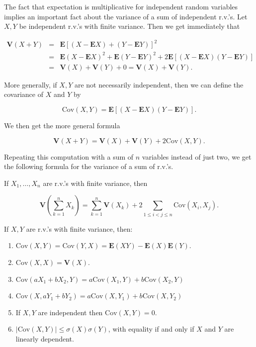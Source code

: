 \noindent The fact that expectation is multiplicative for
independent random variables implies an important fact
about the variance of a sum of independent r.v.'s. Let
$X,Y$ be independent r.v.'s with finite variance.
Then we get immediately that

\begin{eqnarray*}
\mathbf{V}(X+Y) &=& \mathbf{E}\left[(X-\mathbf{E} X)+(Y-\mathbf{E} Y)\right]^2 \\ &=&
\mathbf{E}(X-\mathbf{E} X)^2 + \mathbf{E}(Y-\mathbf{E} Y)^2 +2 \mathbf{E}\left[ (X-\mathbf{E} X)(Y-\mathbf{E} Y)\right] \\
&=& \mathbf{V}(X)+\mathbf{V}(Y) + 0 = \mathbf{V}(X)+\mathbf{V}(Y).
\end{eqnarray*}

\noindent More generally, if $X,Y$ are not necessarily
independent, then we can define the covariance of $X$
and $Y$ by

\[
\textrm{Cov}(X,Y) = \mathbf{E}\left[ (X-\mathbf{E} X)(Y-\mathbf{E} Y)\right].
\]

\noindent We then get the more general formula

\[
\mathbf{V}(X+Y) = \mathbf{V}(X) + \mathbf{V}(Y) + 2 \textrm{Cov}(X,Y).
\]

\noindent Repeating this computation with a sum of $n$
variables instead of just two, we get the following
formula for the variance of a sum of r.v.'s.

\begin{lem}
If $X_1,\ldots,X_n$ are r.v.'s with finite variance,
then

\[
\mathbf{V}\left(\sum_{k=1}^n X_k\right) = \sum_{k=1}^n \mathbf{V}(X_k) + 2 \sum_{1\le i<j\le n} \textrm{Cov}(X_i,X_j).
\]

\end{lem}

\begin{lem}
If $X,Y$ are r.v.'s with finite variance, then:

\begin{enumerate}[label=\arabic*.]
\item $\textrm{Cov}(X,Y)=\textrm{Cov}(Y,X) = \mathbf{E}(XY)
- \mathbf{E}(X) \mathbf{E}(Y)$.

\item $\textrm{Cov}(X,X) = \mathbf{V}(X)$.

\item $\textrm{Cov}(aX_1+bX_2,Y) =
a\textrm{Cov}(X_1,Y)+b\textrm{Cov}(X_2,Y)$

\item $\textrm{Cov}(X,aY_1+bY_2) =
a\textrm{Cov}(X,Y_1)+b\textrm{Cov}(X,Y_2)$

\item If $X,Y$ are independent then $\textrm{Cov}(X,Y)=0$.

\item $|\textrm{Cov}(X,Y)| \le \sigma(X) \sigma(Y)$, with
equality if and only if $X$ and $Y$ are linearly
dependent.
\end{enumerate}

\end{lem}

